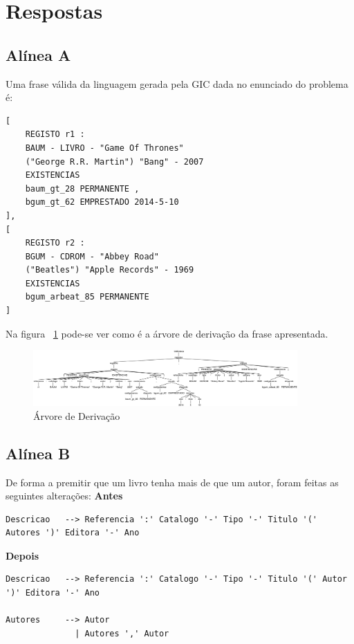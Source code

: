 \section{Respostas}
\subsection{Alínea A} %
\label{sub:alinea_a}

Uma frase válida da linguagem gerada pela GIC dada no enunciado do problema é:

\begin{verbatim}
[
	REGISTO r1 :
	BAUM - LIVRO - "Game Of Thrones"
	("George R.R. Martin") "Bang" - 2007
	EXISTENCIAS
	baum_gt_28 PERMANENTE ,
	bgum_gt_62 EMPRESTADO 2014-5-10
],
[
	REGISTO r2 :
	BGUM - CDROM - "Abbey Road"
	("Beatles") "Apple Records" - 1969
	EXISTENCIAS
	bgum_arbeat_85 PERMANENTE
]
\end{verbatim}

Na figura ~\ref{fig:alinea_a} pode-se ver como é a árvore de derivação da frase apresentada.

\begin{figure}[!h]
	\centering
    \includegraphics[width=0.9\textwidth]{./imagens/alineaa.png}
    \caption{Árvore de Derivação}
    \label{fig:alinea_a}
\end{figure}

\subsection{Alínea B} %
\label{sub:alinea_b}

De forma a premitir que um livro tenha mais de que um autor, foram feitas as seguintes alterações:
\textbf{Antes}
\begin{verbatim}
Descricao   --> Referencia ':' Catalogo '-' Tipo '-' Titulo '(' Autores ')' Editora '-' Ano

\end{verbatim}
\textbf{Depois}
\begin{verbatim}
Descricao   --> Referencia ':' Catalogo '-' Tipo '-' Titulo '(' Autor ')' Editora '-' Ano

Autores     --> Autor
              | Autores ',' Autor

\end{verbatim}


